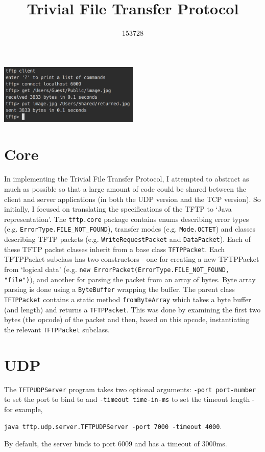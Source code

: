 \documentclass[a4paper]{article}
\title{\vspace{-5ex}Trivial File Transfer Protocol}
\author{153728}
\date{}
\newcommand{\code}{\texttt}
\begin{document}
\maketitle
\vspace{-4ex}
\noindent

\begin{center}
\includegraphics[width=0.5\textwidth]{image}
\end{center}

\section{Core}

In implementing the Trivial File Transfer Protocol, I attempted to abstract as much as possible so that a large amount of code could be shared between the client and server applications (in both the UDP version and the TCP version). So initially, I focused on translating the specifications of the TFTP to `Java representation'. The \code{tftp.core} package contains enums describing error types (e.g. \code{ErrorType.FILE\_NOT\_FOUND}), transfer modes (e.g. \code{Mode.OCTET}) and classes describing TFTP packets (e.g. \code{WriteRequestPacket} and \code{DataPacket}). Each of these TFTP packet classes inherit from a base class \code{TFTPPacket}. Each TFTPPacket subclass has two constructors - one for creating a new TFTPPacket from `logical data' (e.g. \code{new ErrorPacket(ErrorType.FILE\_NOT\_FOUND, "file")}), and another for parsing the packet from an array of bytes. Byte array parsing is done using a \code{ByteBuffer} wrapping the buffer. The parent class \code{TFTPPacket} contains a static method \code{fromByteArray} which takes a byte buffer (and length) and returns a \code{TFTPPacket}. This was done by examining the first two bytes (the opcode) of the packet and then, based on this opcode, instantiating the relevant \code{TFTPPacket} subclass.

\section{UDP}

The \code{TFTPUDPServer} program takes two optional arguments: \code{-port port-number} to set the port to bind to and \code{-timeout time-in-ms} to set the timeout length - for example,
\begin{center}
\code{java tftp.udp.server.TFTPUDPServer -port 7000 -timeout 4000}.
\end{center}
By default, the server binds to port 6009 and has a timeout of 3000ms.
\end{document}
